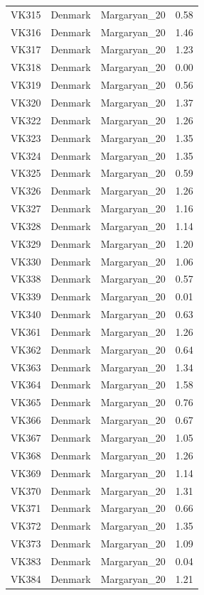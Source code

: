 \begin{longtable}[t]{lllr}
VK315 & Denmark & Margaryan\_20 & 0.58\\
VK316 & Denmark & Margaryan\_20 & 1.46\\
VK317 & Denmark & Margaryan\_20 & 1.23\\
VK318 & Denmark & Margaryan\_20 & 0.00\\
VK319 & Denmark & Margaryan\_20 & 0.56\\
VK320 & Denmark & Margaryan\_20 & 1.37\\
VK322 & Denmark & Margaryan\_20 & 1.26\\
VK323 & Denmark & Margaryan\_20 & 1.35\\
VK324 & Denmark & Margaryan\_20 & 1.35\\
VK325 & Denmark & Margaryan\_20 & 0.59\\
VK326 & Denmark & Margaryan\_20 & 1.26\\
VK327 & Denmark & Margaryan\_20 & 1.16\\
VK328 & Denmark & Margaryan\_20 & 1.14\\
VK329 & Denmark & Margaryan\_20 & 1.20\\
VK330 & Denmark & Margaryan\_20 & 1.06\\
VK338 & Denmark & Margaryan\_20 & 0.57\\
VK339 & Denmark & Margaryan\_20 & 0.01\\
VK340 & Denmark & Margaryan\_20 & 0.63\\
VK361 & Denmark & Margaryan\_20 & 1.26\\
VK362 & Denmark & Margaryan\_20 & 0.64\\
VK363 & Denmark & Margaryan\_20 & 1.34\\
VK364 & Denmark & Margaryan\_20 & 1.58\\
VK365 & Denmark & Margaryan\_20 & 0.76\\
VK366 & Denmark & Margaryan\_20 & 0.67\\
VK367 & Denmark & Margaryan\_20 & 1.05\\
VK368 & Denmark & Margaryan\_20 & 1.26\\
VK369 & Denmark & Margaryan\_20 & 1.14\\
VK370 & Denmark & Margaryan\_20 & 1.31\\
VK371 & Denmark & Margaryan\_20 & 0.66\\
VK372 & Denmark & Margaryan\_20 & 1.35\\
VK373 & Denmark & Margaryan\_20 & 1.09\\
VK383 & Denmark & Margaryan\_20 & 0.04\\
VK384 & Denmark & Margaryan\_20 & 1.21\\

\end{longtable}
